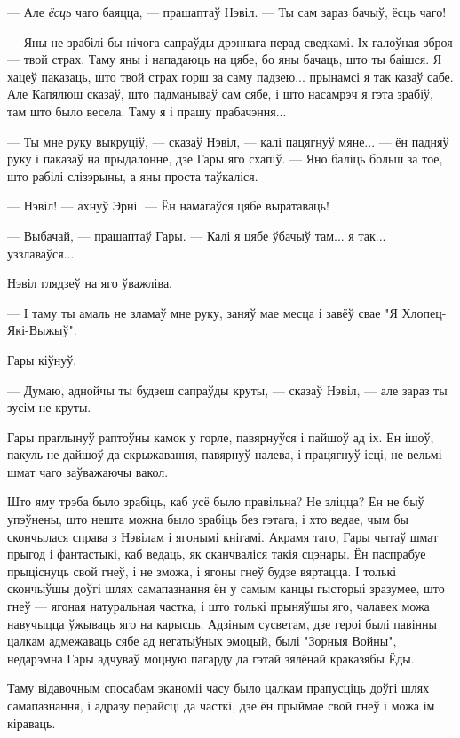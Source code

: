 --- Але \emph{ёсць} чаго баяцца, --- прашаптаў Нэвіл. --- Ты сам зараз бачыў, ёсць чаго!

--- Яны  не зрабілі бы нічога сапраўды дрэннага перад сведкамі. Іх галоўная зброя ---
твой страх. Таму яны і нападаюць на цябе, бо яны бачаць, што ты баішся. 
Я хацеў паказаць, што твой страх горш за саму падзею... прынамсі я так казаў сабе.
Але Капялюш сказаў, што падманываў сам сябе, і што насамрэч я гэта зрабіў, там 
што было весела. Таму я і прашу прабачэння...

--- Ты мне руку выкруціў, --- сказаў Нэвіл, --- калі пацягнуў мяне... --- 
ён падняў руку і паказаў на прыдалонне, дзе Гары яго схапіў. --- Яно баліць больш за 
тое, што рабілі слізэрыны, а яны проста таўкаліся.

--- Нэвіл! --- ахнуў Эрні. --- Ён намагаўся цябе выратаваць!

--- Выбачай, --- прашаптаў Гары. --- Калі я цябе ўбачыў там... я так...
уззлаваўся...

Нэвіл глядзеў на яго ўважліва.

--- І таму ты амаль не зламаў мне руку, заняў мае месца і завёў свае "Я Хлопец-Які-Выжыў".

Гары кіўнуў.

--- Думаю, аднойчы ты будзеш сапраўды круты, --- сказаў Нэвіл, --- але зараз ты 
зусім не круты.

Гары праглынуў раптоўны камок у горле, павярнуўся і пайшоў ад іх. Ён ішоў, пакуль
не дайшоў да скрыжавання, павярнуў налева, і працягнуў ісці, не вельмі шмат чаго 
заўважаючы вакол.

Што яму трэба было зрабіць, каб усё было правільна? Не зліцца? Ён не быў упэўнены,
што нешта можна было зрабіць без гэтага, і хто ведае, чым бы скончылася справа 
з Нэвілам і ягонымі кнігамі. Акрамя таго, Гары чытаў шмат прыгод і фантастыкі, 
каб ведаць, як сканчваліся такія сцэнары. Ён паспрабуе прыціснуць свой гнеў,
і не зможа, і ягоны гнеў будзе вяртацца. І толькі скончыўшы доўгі шлях 
самапазнання ён у самым канцы гысторыі зразумее, што гнеў --- ягоная 
натуральная частка, і што толькі прыняўшы яго, чалавек можа навучыцца 
ўжываць яго на карысць. Адзіным сусветам, дзе героі былі павінны цалкам 
адмежаваць сябе ад негатыўных эмоцый, былі "Зорныя Войны", недарэмна Гары
адчуваў моцную пагарду да гэтай зялёнай краказябы Ёды. 

Таму відавочным спосабам эканоміі часу было цалкам прапусціць  доўгі шлях 
самапазнання, і адразу перайсці да часткі, дзе ён прыймае свой гнеў і можа ім
кіраваць.

